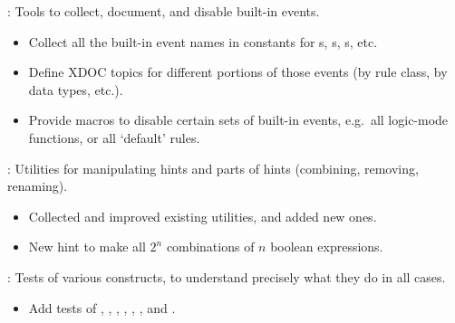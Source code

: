 
\begin{frame}

\newlibtitle

:
Tools to collect, document, and disable built-in events.
\begin{itemize}
\item Collect all the built-in event names in constants for
      s, s, s, etc.
\item Define XDOC topics for different portions of those events
      (by rule class, by data types, etc.).
\item Provide macros to disable certain sets of built-in events,
      e.g.\ all logic-mode functions, or all `default' rules.
\end{itemize}

\end{frame}


\begin{frame}

\newlibtitle

:
Utilities for manipulating hints and parts of hints (combining, removing, renaming).
\begin{itemize}
\item Collected and improved existing utilities, and added new ones.
\item New  hint to make all $2^n$ combinations of $n$ boolean expressions.
\end{itemize}

\end{frame}


\begin{frame}

\newlibtitle

:
Tests of various constructs, to understand precisely what they do in all cases.
\begin{itemize}
\item Add tests of , , , , , , and .
\end{itemize}

\end{frame}

